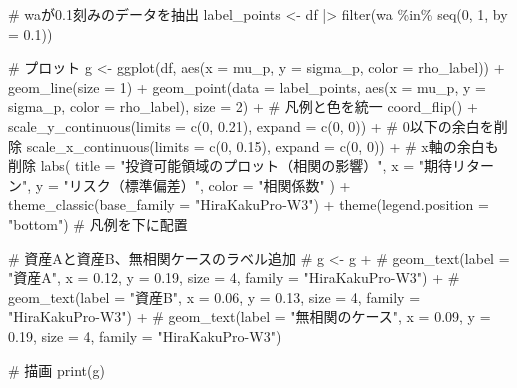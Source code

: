 \documentclass[
  letterpaper,
  pandoc,
  ja=standard,
  jafont = hiragino-pron]{ltjsbook}
\newenvironment{Shaded}{\begin{snugshade}}{\end{snugshade}}
\newcommand{\AttributeTok}[1]{\textcolor[rgb]{0.40,0.45,0.13}{#1}}
\newcommand{\CommentTok}[1]{\textcolor[rgb]{0.37,0.37,0.37}{#1}}
\newcommand{\DecValTok}[1]{\textcolor[rgb]{0.68,0.00,0.00}{#1}}
\newcommand{\FloatTok}[1]{\textcolor[rgb]{0.68,0.00,0.00}{#1}}
\newcommand{\FunctionTok}[1]{\textcolor[rgb]{0.28,0.35,0.67}{#1}}
\newcommand{\NormalTok}[1]{\textcolor[rgb]{0.00,0.23,0.31}{#1}}
\newcommand{\OtherTok}[1]{\textcolor[rgb]{0.00,0.23,0.31}{#1}}
\newcommand{\SpecialCharTok}[1]{\textcolor[rgb]{0.37,0.37,0.37}{#1}}
\newcommand{\StringTok}[1]{\textcolor[rgb]{0.13,0.47,0.30}{#1}}
\begin{document}
\begin{Shaded}
\begin{Highlighting}[]
\CommentTok{\# waが0.1刻みのデータを抽出}
\NormalTok{label\_points }\OtherTok{\textless{}{-}}\NormalTok{ df }\SpecialCharTok{|\textgreater{}}
  \FunctionTok{filter}\NormalTok{(wa }\SpecialCharTok{\%in\%} \FunctionTok{seq}\NormalTok{(}\DecValTok{0}\NormalTok{, }\DecValTok{1}\NormalTok{, }\AttributeTok{by =} \FloatTok{0.1}\NormalTok{))}

\CommentTok{\# プロット}
\NormalTok{g }\OtherTok{\textless{}{-}} \FunctionTok{ggplot}\NormalTok{(df, }\FunctionTok{aes}\NormalTok{(}\AttributeTok{x =}\NormalTok{ mu\_p, }\AttributeTok{y =}\NormalTok{ sigma\_p, }\AttributeTok{color =}\NormalTok{ rho\_label)) }\SpecialCharTok{+}
  \FunctionTok{geom\_line}\NormalTok{(}\AttributeTok{size =} \DecValTok{1}\NormalTok{) }\SpecialCharTok{+}
  \FunctionTok{geom\_point}\NormalTok{(}\AttributeTok{data =}\NormalTok{ label\_points, }\FunctionTok{aes}\NormalTok{(}\AttributeTok{x =}\NormalTok{ mu\_p, }\AttributeTok{y =}\NormalTok{ sigma\_p, }\AttributeTok{color =}\NormalTok{ rho\_label), }\AttributeTok{size =} \DecValTok{2}\NormalTok{) }\SpecialCharTok{+}  \CommentTok{\# 凡例と色を統一}
  \FunctionTok{coord\_flip}\NormalTok{() }\SpecialCharTok{+}
  \FunctionTok{scale\_y\_continuous}\NormalTok{(}\AttributeTok{limits =} \FunctionTok{c}\NormalTok{(}\DecValTok{0}\NormalTok{, }\FloatTok{0.21}\NormalTok{), }\AttributeTok{expand =} \FunctionTok{c}\NormalTok{(}\DecValTok{0}\NormalTok{, }\DecValTok{0}\NormalTok{)) }\SpecialCharTok{+}  \CommentTok{\# 0以下の余白を削除}
  \FunctionTok{scale\_x\_continuous}\NormalTok{(}\AttributeTok{limits =} \FunctionTok{c}\NormalTok{(}\DecValTok{0}\NormalTok{, }\FloatTok{0.15}\NormalTok{), }\AttributeTok{expand =} \FunctionTok{c}\NormalTok{(}\DecValTok{0}\NormalTok{, }\DecValTok{0}\NormalTok{)) }\SpecialCharTok{+} \CommentTok{\# x軸の余白も削除}
  \FunctionTok{labs}\NormalTok{(}
    \AttributeTok{title =} \StringTok{"投資可能領域のプロット（相関の影響）"}\NormalTok{,}
    \AttributeTok{x =} \StringTok{"期待リターン"}\NormalTok{,}
    \AttributeTok{y =} \StringTok{"リスク（標準偏差）"}\NormalTok{,}
    \AttributeTok{color =} \StringTok{"相関係数"}
\NormalTok{  ) }\SpecialCharTok{+}
  \FunctionTok{theme\_classic}\NormalTok{(}\AttributeTok{base\_family =} \StringTok{"HiraKakuPro{-}W3"}\NormalTok{) }\SpecialCharTok{+}
  \FunctionTok{theme}\NormalTok{(}\AttributeTok{legend.position =} \StringTok{"bottom"}\NormalTok{)  }\CommentTok{\# 凡例を下に配置}

\CommentTok{\# 資産Aと資産B、無相関ケースのラベル追加}
\CommentTok{\# g \textless{}{-} g +}
\CommentTok{\#   geom\_text(label = "資産A", x = 0.12, y = 0.19, size = 4, family = "HiraKakuPro{-}W3") +}
\CommentTok{\#   geom\_text(label = "資産B", x = 0.06, y = 0.13, size = 4, family = "HiraKakuPro{-}W3") +}
\CommentTok{\#   geom\_text(label = "無相関のケース", x = 0.09, y = 0.19, size = 4, family = "HiraKakuPro{-}W3")}

\CommentTok{\# 描画}
\FunctionTok{print}\NormalTok{(g)}
\end{Highlighting}
\end{Shaded}
\end{document}
